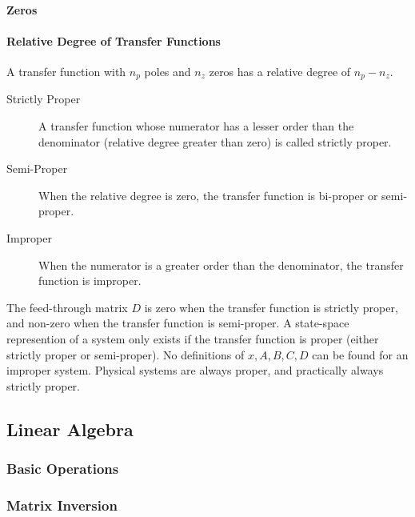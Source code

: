 \documentclass[../notes.tex]{subfiles}
\begin{document}
\paragraph{Zeros}

\paragraph{Relative Degree of Transfer Functions}
A transfer function with $n_p$ poles and $n_z$ zeros has a relative degree of $n_p - n_z$. \\
\begin{description}
    \item[Strictly Proper] A transfer function whose numerator has a lesser order than the denominator (relative degree greater than zero) is called strictly proper.
    \item[Semi-Proper] When the relative degree is zero, the transfer function is bi-proper or semi-proper.
    \item[Improper] When the numerator is a greater order than the denominator, the transfer function is improper. 
\end{description}
The feed-through matrix $D$ is zero when the transfer function is strictly proper, and non-zero when the transfer function is semi-proper. A state-space represention of a system only exists if the transfer function is proper (either strictly proper or semi-proper). No definitions of $x, A, B, C, D$ can be found for an improper system. Physical systems are always proper, and practically always strictly proper.

\subsection{Linear Algebra}
\subsubsection{Basic Operations}
\subsubsection{Matrix Inversion}
\end{document}
